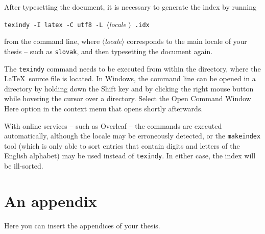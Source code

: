 \documentclass[
  digital, %
  table,   %
  lof,     %
  lot,     %
]{fithesis3}
\begin{document}
After typesetting the document, it is necessary to generate the
index by running
\begin{center}%
  \texttt{texindy -I latex -C utf8 -L }$\langle$\textit{locale}%
  $\rangle$\texttt{ \jobname.idx}
\end{center}
from the command line, where $\langle$\textit{locale}$\rangle$
corresponds to the main locale of your thesis -- such as
\texttt{slovak}, and then typesetting the document again.

The \texttt{texindy} command needs to be executed from within the
directory, where the \LaTeX\ source file is located. In Windows,
the command line can be opened in a directory by holding down the
\textsf{Shift} key and by clicking the right mouse button while
hovering the cursor over a directory. Select the \textsf{Open Command
Window Here} option in the context menu that opens shortly
afterwards.

With online services -- such as Overleaf -- the commands are
executed automatically, although the locale may be erroneously
detected, or the \texttt{makeindex} tool (which is only able to
sort entries that contain digits and letters of the English
alphabet) may be used instead of \texttt{texindy}. In either case,
the index will be ill-sorted.

  \makeatletter\thesis@blocks@clear\makeatother
  \printindex

\appendix %
\chapter{An appendix}
Here you can insert the appendices of your thesis.
\end{document}
